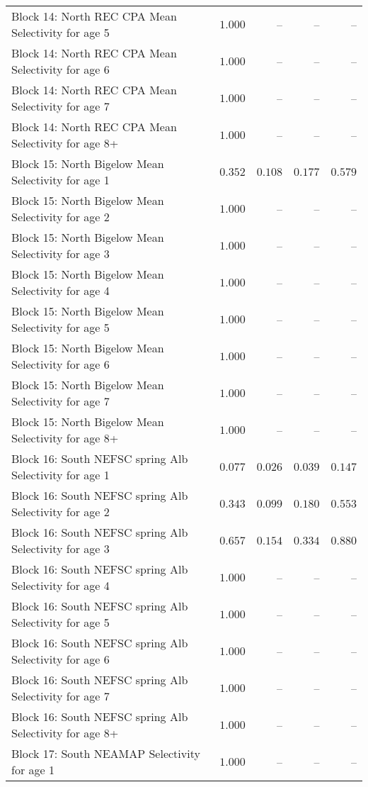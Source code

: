 \documentclass[
]{article}
\begin{document}
\begin{landscape}
\begin{longtable}[t]{lrrrr}
\addlinespace
Block 14: North REC CPA Mean Selectivity for age 5 & $1.000$ & -- & -- & --\\
Block 14: North REC CPA Mean Selectivity for age 6 & $1.000$ & -- & -- & --\\
Block 14: North REC CPA Mean Selectivity for age 7 & $1.000$ & -- & -- & --\\
Block 14: North REC CPA Mean Selectivity for age 8+ & $1.000$ & -- & -- & --\\
Block 15: North Bigelow Mean Selectivity for age 1 & $0.352$ & $0.108$ & $0.177$ & $0.579$\\
\addlinespace
Block 15: North Bigelow Mean Selectivity for age 2 & $1.000$ & -- & -- & --\\
Block 15: North Bigelow Mean Selectivity for age 3 & $1.000$ & -- & -- & --\\
Block 15: North Bigelow Mean Selectivity for age 4 & $1.000$ & -- & -- & --\\
Block 15: North Bigelow Mean Selectivity for age 5 & $1.000$ & -- & -- & --\\
Block 15: North Bigelow Mean Selectivity for age 6 & $1.000$ & -- & -- & --\\
\addlinespace
Block 15: North Bigelow Mean Selectivity for age 7 & $1.000$ & -- & -- & --\\
Block 15: North Bigelow Mean Selectivity for age 8+ & $1.000$ & -- & -- & --\\
Block 16: South NEFSC spring Alb Selectivity for age 1 & $0.077$ & $0.026$ & $0.039$ & $0.147$\\
Block 16: South NEFSC spring Alb Selectivity for age 2 & $0.343$ & $0.099$ & $0.180$ & $0.553$\\
Block 16: South NEFSC spring Alb Selectivity for age 3 & $0.657$ & $0.154$ & $0.334$ & $0.880$\\
\addlinespace
Block 16: South NEFSC spring Alb Selectivity for age 4 & $1.000$ & -- & -- & --\\
Block 16: South NEFSC spring Alb Selectivity for age 5 & $1.000$ & -- & -- & --\\
Block 16: South NEFSC spring Alb Selectivity for age 6 & $1.000$ & -- & -- & --\\
Block 16: South NEFSC spring Alb Selectivity for age 7 & $1.000$ & -- & -- & --\\
Block 16: South NEFSC spring Alb Selectivity for age 8+ & $1.000$ & -- & -- & --\\
\addlinespace
Block 17: South NEAMAP Selectivity for age 1 & $1.000$ & -- & -- & --\\

\end{longtable}
\end{landscape}
\end{document}
